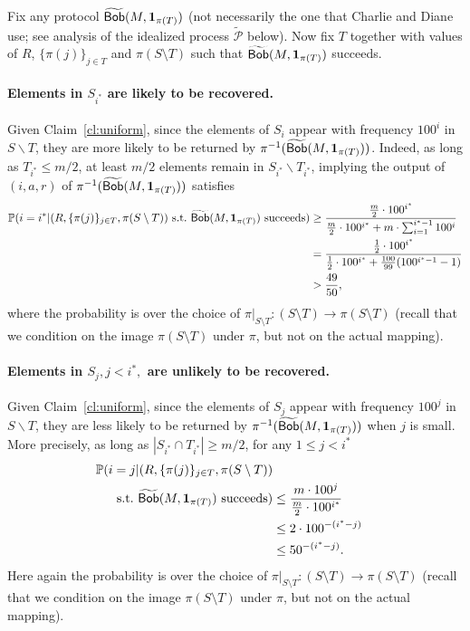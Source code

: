 Fix any protocol $\widetilde{\mathsf{Bob}}(M, \mathbf{1}_{\pi(T)})$ (not necessarily the one that Charlie and Diane use; see analysis of the idealized process $\widetilde{\mathcal{P}}$ below). Now fix $T$ together with values of $R$, $\{\pi(j)\}_{j\in T}$ and $\pi(S\setminus T)$ such that  $\widetilde{\mathsf{Bob}}(M, \mathbf{1}_{\pi(T)})$ succeeds.  

\paragraph{Elements in $S_{i^*}$ are likely to be recovered.}   Given Claim~\ref{cl:uniform}, since the elements of $S_i$ appear with frequency $100^i$ in $S\backslash T$, they are more likely to be returned by $\pi^{-1}(\widetilde{\mathsf{Bob}}(M, \mathbf{1}_{\pi(T)}))$. Indeed, as long as $T_{i^*}\le m/2$, at least $m/2$ elements remain in $S_{i^*}\backslash T_{i^*}$, implying the output of $(i, a, r)$ of $\pi^{-1}(\widetilde{\mathsf{Bob}}(M, \mathbf{1}_{\pi(T)}))$ satisfies
\begin{equation}
\begin{split}
\Pr(i = i^* | (R, \{\pi(j)\}_{j\in T}, \pi(S\setminus T)) \text{~s.t.~}\widetilde{\query}(M, \mathbf{1}_{\pi(T)})\text{~succeeds}) &\ge \frac{\frac m2\cdot 100^{i^*}}{\frac m2\cdot 100^{i^*} + m\cdot \sum_{i=1}^{i^*-1} 100^i}\\
& = \frac{\frac 12\cdot 100^{i^*}}{\frac 12\cdot 100^{i^*} + \frac {100}{99}(100^{i^*-1} - 1)}\\
& > \frac{49}{50} , \label{eqn:istar-likely}
\end{split}
\end{equation}
where the probability is over the choice of $\pi|_{S\setminus T}:(S\setminus T)\to \pi(S\setminus T)$ (recall that we condition on the image $\pi(S\setminus T)$ under $\pi$, but not on the actual mapping).
\fi


\paragraph{Elements in $S_{j}, j<i^*,$ are unlikely to be recovered.} Given Claim~\ref{cl:uniform}, since the elements of $S_j$ appear with frequency $100^j$ in $S\backslash T$, they are less likely to be returned by $\pi^{-1}(\widetilde{\mathsf{Bob}}(M, \mathbf{1}_{\pi(T)}))$ when $j$ is small.  More precisely, as long as $|S_{i^*}\cap T_{i^*}|\geq m/2$, for any $1\le j< i^*$
\begin{equation}
\begin{split}
\Pr(i = j | (R, \{\pi(j)\}_{j\in T}, \pi(S\setminus T)) \\ \text{~s.t.~}\widetilde{\query}(M, \mathbf{1}_{\pi(T)})\text{~succeeds})& \le \frac{m\cdot 100^j}{\frac m2\cdot 100^{i^*}}\\
& \le 2\cdot 100^{-(i^*-j)} \\
&\le 50^{-(i^*-j)} . \label{eqn:others-unlikely}
\end{split}
\end{equation}
Here again the probability is over the choice of $\pi|_{S\setminus T}:(S\setminus T)\to \pi(S\setminus T)$ (recall that we condition on the image $\pi(S\setminus T)$ under $\pi$, but not on the actual mapping).

